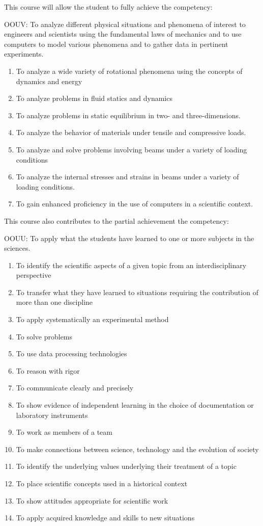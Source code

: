 {This course will allow the student to fully achieve the competency:

OOUV: To analyze different physical situations and phenomena of interest to engineers and scientists using the fundamental laws of mechanics and to use computers to model various phenomena and to gather data in pertinent experiments.
\begin{enumerate}
\item To analyze a wide variety of rotational phenomena using the concepts of dynamics and energy 
\item To analyze problems in fluid statics and dynamics
\item To analyze problems in static equilibrium in two- and three-dimensions.
\item To analyze the behavior of materials under tensile and compressive loads.
\item To analyze and solve problems involving beams under a variety of loading conditions
\item To analyze the internal stresses and strains in beams under a variety of loading conditions.
\item To gain enhanced proficiency in the use of computers in a scientific context.
\end{enumerate}
\smallskip
This course also contributes to the partial achievement the competency:

OOUU:	To apply what the students have learned to one or more subjects in the sciences.
\begin{enumerate}
\item To identify the scientific aspects of a given topic from an interdisciplinary perspective
\item To transfer what they have learned to situations requiring the contribution of more than one discipline
\item To apply systematically an experimental method
\item To solve problems
\item To use data processing technologies	
\item To reason with rigor
\item To communicate clearly and precisely
\item To show evidence of independent learning in the choice of documentation or laboratory instruments
\item To work as members of a team
\item To make connections between science, technology and the evolution of society
\item To identify the underlying values underlying their treatment of a topic
\item To place scientific concepts used in a historical context
\item To show attitudes appropriate for scientific work 
\item To apply acquired knowledge and skills to new situations
\end{enumerate}
}